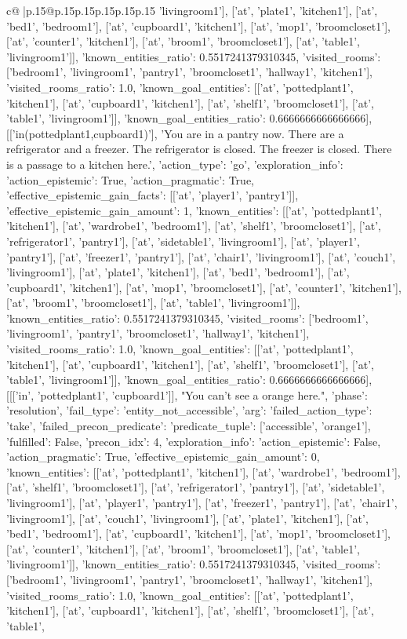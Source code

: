 \documentclass{article}
\begin{document}
{\begin{supertabular}{c@{$\;$}|p{.15\linewidth}@{}p{.15\linewidth}p{.15\linewidth}p{.15\linewidth}p{.15\linewidth}p{.15\linewidth}}
{{{'livingroom1'], ['at', 'plate1', 'kitchen1'], ['at', 'bed1', 'bedroom1'], ['at', 'cupboard1', 'kitchen1'], ['at', 'mop1', 'broomcloset1'], ['at', 'counter1', 'kitchen1'], ['at', 'broom1', 'broomcloset1'], ['at', 'table1', 'livingroom1']], 'known_entities_ratio': 0.5517241379310345, 'visited_rooms': ['bedroom1', 'livingroom1', 'pantry1', 'broomcloset1', 'hallway1', 'kitchen1'], 'visited_rooms_ratio': 1.0, 'known_goal_entities': [['at', 'pottedplant1', 'kitchen1'], ['at', 'cupboard1', 'kitchen1'], ['at', 'shelf1', 'broomcloset1'], ['at', 'table1', 'livingroom1']], 'known_goal_entities_ratio': 0.6666666666666666}}], [['in(pottedplant1,cupboard1)'], 'You are in a pantry now. There are a refrigerator and a freezer. The refrigerator is closed. The freezer is closed. There is a passage to a kitchen here.', {'action_type': 'go', 'exploration_info': {'action_epistemic': True, 'action_pragmatic': True, 'effective_epistemic_gain_facts': [['at', 'player1', 'pantry1']], 'effective_epistemic_gain_amount': 1, 'known_entities': [['at', 'pottedplant1', 'kitchen1'], ['at', 'wardrobe1', 'bedroom1'], ['at', 'shelf1', 'broomcloset1'], ['at', 'refrigerator1', 'pantry1'], ['at', 'sidetable1', 'livingroom1'], ['at', 'player1', 'pantry1'], ['at', 'freezer1', 'pantry1'], ['at', 'chair1', 'livingroom1'], ['at', 'couch1', 'livingroom1'], ['at', 'plate1', 'kitchen1'], ['at', 'bed1', 'bedroom1'], ['at', 'cupboard1', 'kitchen1'], ['at', 'mop1', 'broomcloset1'], ['at', 'counter1', 'kitchen1'], ['at', 'broom1', 'broomcloset1'], ['at', 'table1', 'livingroom1']], 'known_entities_ratio': 0.5517241379310345, 'visited_rooms': ['bedroom1', 'livingroom1', 'pantry1', 'broomcloset1', 'hallway1', 'kitchen1'], 'visited_rooms_ratio': 1.0, 'known_goal_entities': [['at', 'pottedplant1', 'kitchen1'], ['at', 'cupboard1', 'kitchen1'], ['at', 'shelf1', 'broomcloset1'], ['at', 'table1', 'livingroom1']], 'known_goal_entities_ratio': 0.6666666666666666}}], [[['in', 'pottedplant1', 'cupboard1']], "You can't see a orange here.", {'phase': 'resolution', 'fail_type': 'entity_not_accessible', 'arg': {'failed_action_type': 'take', 'failed_precon_predicate': {'predicate_tuple': ['accessible', 'orange1'], 'fulfilled': False, 'precon_idx': 4}}, 'exploration_info': {'action_epistemic': False, 'action_pragmatic': True, 'effective_epistemic_gain_amount': 0, 'known_entities': [['at', 'pottedplant1', 'kitchen1'], ['at', 'wardrobe1', 'bedroom1'], ['at', 'shelf1', 'broomcloset1'], ['at', 'refrigerator1', 'pantry1'], ['at', 'sidetable1', 'livingroom1'], ['at', 'player1', 'pantry1'], ['at', 'freezer1', 'pantry1'], ['at', 'chair1', 'livingroom1'], ['at', 'couch1', 'livingroom1'], ['at', 'plate1', 'kitchen1'], ['at', 'bed1', 'bedroom1'], ['at', 'cupboard1', 'kitchen1'], ['at', 'mop1', 'broomcloset1'], ['at', 'counter1', 'kitchen1'], ['at', 'broom1', 'broomcloset1'], ['at', 'table1', 'livingroom1']], 'known_entities_ratio': 0.5517241379310345, 'visited_rooms': ['bedroom1', 'livingroom1', 'pantry1', 'broomcloset1', 'hallway1', 'kitchen1'], 'visited_rooms_ratio': 1.0, 'known_goal_entities': [['at', 'pottedplant1', 'kitchen1'], ['at', 'cupboard1', 'kitchen1'], ['at', 'shelf1', 'broomcloset1'], ['at', 'table1', }}}
\end{supertabular}}
\end{document}
